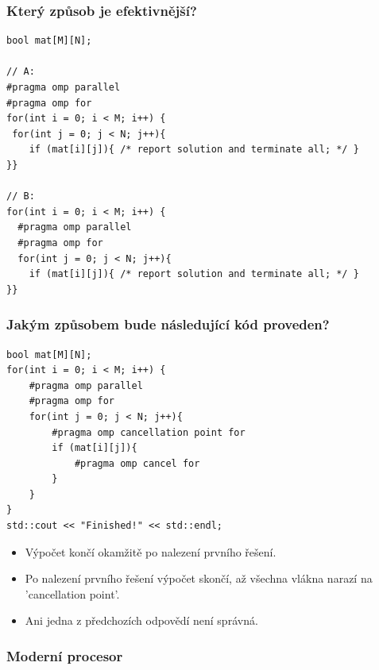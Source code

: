 \documentclass[usenames,dvipsnames,9pt]{beamer}
\begin{document}
{
\begin{frame}[fragile]
\frametitle{Který způsob je efektivnější?}

 \begin{verbatim}
bool mat[M][N];

// A:
#pragma omp parallel
#pragma omp for
for(int i = 0; i < M; i++) {
 for(int j = 0; j < N; j++){
    if (mat[i][j]){ /* report solution and terminate all; */ }
}}

// B:
for(int i = 0; i < M; i++) {
  #pragma omp parallel
  #pragma omp for
  for(int j = 0; j < N; j++){
    if (mat[i][j]){ /* report solution and terminate all; */ }
}}
 \end{verbatim}

\end{frame}

\begin{frame}[fragile]
\frametitle{Jakým způsobem bude následující kód proveden?}

 \begin{verbatim}
bool mat[M][N];
for(int i = 0; i < M; i++) {
    #pragma omp parallel
    #pragma omp for
    for(int j = 0; j < N; j++){
        #pragma omp cancellation point for
        if (mat[i][j]){
            #pragma omp cancel for
        }
    }
}
std::cout << "Finished!" << std::endl;
 \end{verbatim}
 
 \vspace{.3em}
 
 \begin{itemize}
 \item Výpočet končí okamžitě po nalezení prvního řešení.
 \item Po nalezení prvního řešení výpočet skončí, až všechna vlákna narazí na 'cancellation point'.
 \item Ani jedna z předchozích odpovědí není správná.
 \end{itemize}

\end{frame}



}

\begin{frame}[t]
  \frametitle{Moderní procesor}
  \centering
\end{frame}
\end{document}
